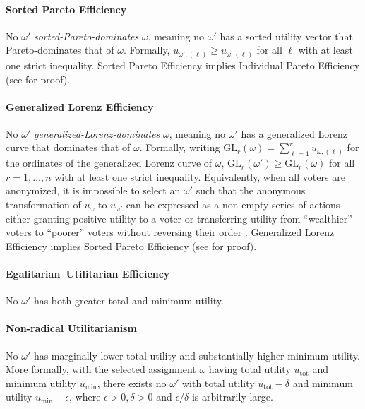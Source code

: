 \documentclass[letterpaper]{article} %
\begin{document}
\paragraph{Sorted Pareto Efficiency \citep{sorted-pareto}}
No $\omega'$ \emph{sorted-Pareto-dominates} $\omega$, meaning no $\omega'$ has a sorted utility vector that Pareto-dominates that of $\omega$.
Formally, $u_{\omega',(\ell)}\ge u_{\omega,(\ell)}$ for all $\ell$ with at least one strict inequality.
Sorted Pareto Efficiency implies Individual Pareto Efficiency (see  for proof).

\paragraph{Generalized Lorenz Efficiency \citep{shorrocks-1983}}
No $\omega'$ \emph{generalized-Lorenz-dominates} $\omega$, meaning no $\omega'$ has a generalized Lorenz curve that dominates that of $\omega$.
Formally, writing $\mathrm{GL}_r(\omega)=\sum_{\ell=1}^{r}u_{\omega,(\ell)}$ for the ordinates of the generalized Lorenz curve of $\omega$, $\mathrm{GL}_r(\omega')\ge\mathrm{GL}_r(\omega)$ for all $r=1,\ldots,n$ with at least one strict inequality.
Equivalently, when all voters are anonymized, it is impossible to select an $\omega'$ such that the anonymous transformation of $u_{\omega}$ to $u_{\omega'}$ can be expressed as a non-empty series of actions either granting positive utility to a voter or transferring utility from ``wealthier'' voters to ``poorer'' voters without reversing their order \citep[Thm.~1]{kostreva-ogryczak-wierzbicki-2004}.
Generalized Lorenz Efficiency implies Sorted Pareto Efficiency (see  for proof).

\paragraph{Egalitarian--Utilitarian Efficiency}
No $\omega'$ has both greater total and minimum utility.

\paragraph{Non-radical Utilitarianism}
No $\omega'$ has marginally lower total utility and substantially higher minimum utility.
More formally, with the selected assignment $\omega$ having total utility $u_{\mathrm{tot}}$ and minimum utility $u_{\mathrm{min}}$, there exists no $\omega'$ with total utility $u_{\mathrm{tot}} - \delta$ and minimum utility $u_{\mathrm{min}} + \epsilon$, where $\epsilon > 0, \delta > 0$ and $\epsilon/\delta$ is arbitrarily large.
\end{document}
